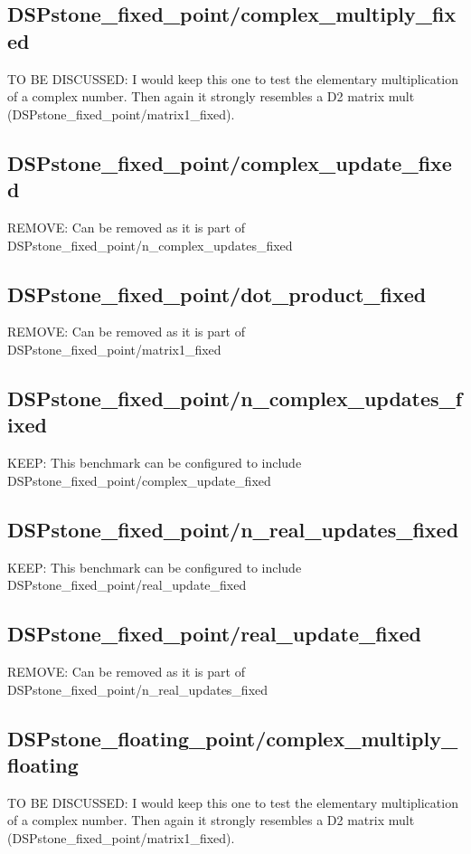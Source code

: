 \documentclass[a4paper]{article}
\begin{document}
\subsection{DSPstone\_fixed\_point/complex\_multiply\_fixed}
	TO BE DISCUSSED: I would keep this one to test the elementary multiplication of a complex number. Then again it strongly resembles a D2 matrix mult (DSPstone\_fixed\_point/matrix1\_fixed).
    
\subsection{DSPstone\_fixed\_point/complex\_update\_fixed}
	REMOVE: Can be removed as it is part of DSPstone\_fixed\_point/n\_complex\_updates\_fixed
    
\subsection{DSPstone\_fixed\_point/dot\_product\_fixed}
	REMOVE: Can be removed as it is part of DSPstone\_fixed\_point/matrix1\_fixed

\subsection{DSPstone\_fixed\_point/n\_complex\_updates\_fixed}
	KEEP: This benchmark can be configured to include DSPstone\_fixed\_point/complex\_update\_fixed 

\subsection{DSPstone\_fixed\_point/n\_real\_updates\_fixed}
	KEEP: This benchmark can be configured to include DSPstone\_fixed\_point/real\_update\_fixed
    
\subsection{DSPstone\_fixed\_point/real\_update\_fixed}
	REMOVE: Can be removed as it is part of DSPstone\_fixed\_point/n\_real\_updates\_fixed
    

\subsection{DSPstone\_floating\_point/complex\_multiply\_floating}
	TO BE DISCUSSED: I would keep this one to test the elementary multiplication of a complex number. Then again it strongly resembles a D2 matrix mult (DSPstone\_fixed\_point/matrix1\_fixed).
    
\end{document}
